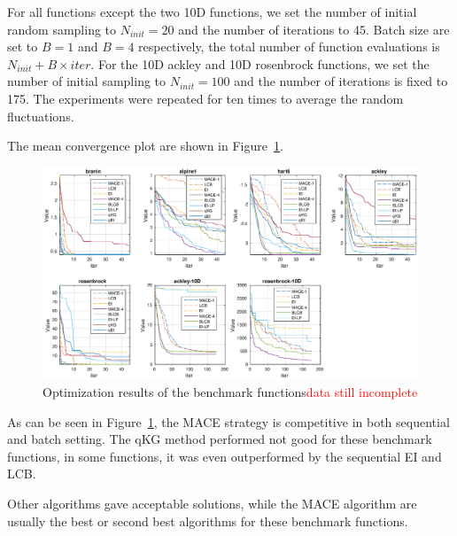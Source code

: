 For all functions except the two 10D functions, we set the number of initial
random sampling to $N_{init} = 20$ and the number of iterations to 45. Batch
size are set to $B = 1 $ and $B = 4$ respectively, the total number of function
evaluations is $N_{init} + B \times iter$. For the 10D ackley and 10D
rosenbrock functions, we set the number of initial sampling to $N_{init} = 100$
and the number of iterations is fixed to 175. The experiments were repeated for
ten times to average the random fluctuations.

The mean convergence plot are shown in Figure~\ref{fig:CovPlotBenchmark}.

\begin{figure}[htbp]
    \vskip 0.2in
    \begin{center}
        \centerline{\includegraphics[width=\linewidth]{./img/convplot.eps}}
        \caption{Optimization results of the benchmark functions\textcolor{red}{data still incomplete}}
        \label{fig:CovPlotBenchmark}
    \end{center}
    \vskip -0.2in
\end{figure}

As can be seen in Figure~\ref{fig:CovPlotBenchmark}, the MACE strategy is
competitive in both sequential and batch setting. The qKG method performed not
good for these benchmark functions, in some functions, it was even outperformed
by the sequential EI and LCB. 

Other algorithms gave acceptable solutions, while the MACE algorithm are
usually the best or second best algorithms for these benchmark functions.

